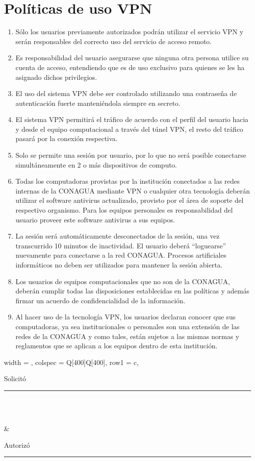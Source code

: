 \documentclass[letterpaper,9pt]{article}
\begin{document}
\section*{Políticas de uso VPN}
{\small \begin{enumerate}
	\item Sólo los usuarios previamente autorizados podrán utilizar el servicio VPN y serán responsables del correcto uso del servicio de acceso remoto.
	\item Es responsabilidad del usuario asegurarse que ninguna otra persona utilice su cuenta de acceso, entendiendo que es de uso exclusivo para quienes se les ha asignado dichos privilegios.
	\item El uso del sistema VPN debe ser controlado utilizando una contraseña de autenticación fuerte  manteniéndola siempre en secreto. 
	\item El sistema VPN permitirá el tráfico de acuerdo con el perfil del usuario hacia y desde el equipo computacional a través del túnel VPN, el resto del tráfico pasará por la conexión respectiva.
	\item Solo se permite una sesión por usuario, por lo que no será posible conectarse simultáneamente en 2 o más dispositivos de computo.
	\item Todas los computadoras provistas por la institución conectados a las redes internas de la CONAGUA mediante VPN o cualquier otra tecnología deberán utilizar el software antivirus actualizado, provisto por el área de soporte del respectivo organismo. Para los equipos personales es responsabilidad del usuario proveer este software antivirus a sus equipos.
	\item La sesión será automáticamente desconectados de la sesión, una vez transcurrido 10 minutos de inactividad. El usuario deberá “loguearse” nuevamente para conectarse a la red CONAGUA. Procesos artificiales informáticos no deben ser utilizados para mantener la sesión abierta.
	\item Los usuarios de equipos computacionales que no son de la CONAGUA, deberán cumplir todas las disposiciones establecidas en las políticas  y además firmar un acuerdo de confidencialidad de la información.
	\item Al hacer uso de la tecnología VPN, los usuarios declaran conocer que sus computadoras, ya sea institucionales o personales son una extensión de las redes de la CONAGUA y como tales, están sujetos a las mismas normas y reglamentos que se aplican a los equipos dentro de esta institución.
\end{enumerate}}

\begin{table}[h]
	\centering
	\begin{tblr}{
			width = \linewidth,
			colspec = {Q[400]Q[400]},			
			row{1} = {c},
		}
		{Solicitó\\[1cm] \rule{6cm}{0.5mm}\\\NOMBRE\\\PUESTO} & {Autorizó\\[1cm] \rule{6cm}{0.5mm}\\\NOMBREJEFE\\\PUESTOJEFE} 
	\end{tblr}
\end{table}
\end{document}
